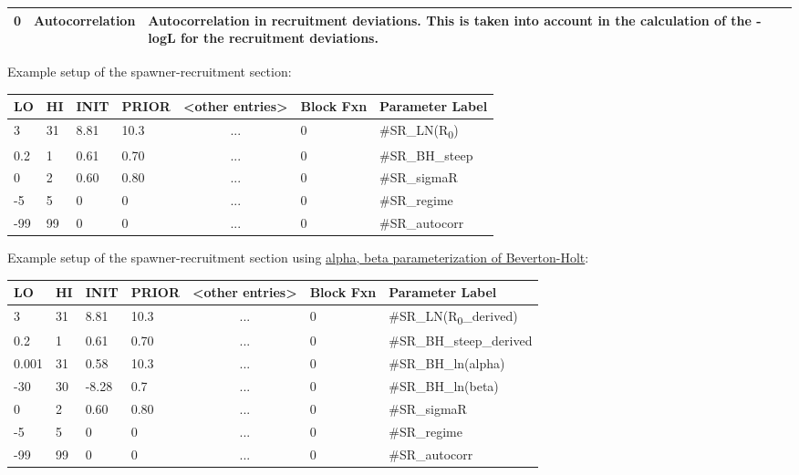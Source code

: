 \begin{longtable}{p{1cm} p{3cm} p{11cm}}
	0 & Autocorrelation & Autocorrelation in recruitment deviations. This is taken into account in the calculation of the -logL for the recruitment deviations. \Tstrut\Bstrut\\
	\hline
\end{longtable}


Example setup of the spawner-recruitment section:
\begin{center}
	\begin{longtable}{p{1cm} p{1cm} p{1cm} p{1.5cm} p{3cm} p{2cm} p{3.5cm}}
		
		\hline
		LO \Tstrut & HI & INIT & PRIOR & <other entries> & Block Fxn & Parameter Label \Bstrut\\
		\hline
		3   & 31 & 8.81 & 10.3 & \multicolumn{1}{c}{...} & 0 & \#SR\_LN(R\textsubscript{0}) \Tstrut\\
		0.2 & 1  & 0.61 & 0.70 & \multicolumn{1}{c}{...} & 0 & \#SR\_BH\_steep \\
		0   & 2  & 0.60 & 0.80 & \multicolumn{1}{c}{...} & 0 & \#SR\_sigmaR \\
		-5  & 5  & 0    & 0    & \multicolumn{1}{c}{...} & 0 & \#SR\_regime \\
		-99 & 99 & 0    & 0    & \multicolumn{1}{c}{...} & 0 & \#SR\_autocorr \Bstrut\\
		\hline
	\end{longtable}
\end{center}
\vspace*{-1.7\baselineskip}

Example setup of the spawner-recruitment section using \hyperlink{BH-ab}{alpha, beta parameterization of Beverton-Holt}:
\begin{center}
	\begin{longtable}{p{1cm} p{1cm} p{1cm} p{1.5cm} p{3cm} p{2cm} p{3.5cm}}
		
		\hline
		LO \Tstrut & HI & INIT & PRIOR & <other entries> & Block Fxn & Parameter Label \Bstrut\\
		\hline
		3     & 31 & 8.81  & 10.3 & \multicolumn{1}{c}{...} & 0 & \#SR\_LN(R\textsubscript{0}\_derived) \Tstrut\\
		0.2   & 1  & 0.61  & 0.70 & \multicolumn{1}{c}{...} & 0 & \#SR\_BH\_steep\_derived \\
		0.001 & 31 & 0.58  & 10.3 & \multicolumn{1}{c}{...} & 0 & \#SR\_BH\_ln(alpha) \\
        -30   & 30 & -8.28 & 0.7  & \multicolumn{1}{c}{...} & 0 & \#SR\_BH\_ln(beta) \\
		0     & 2  & 0.60  & 0.80 & \multicolumn{1}{c}{...} & 0 & \#SR\_sigmaR \\
		-5    & 5  & 0     & 0    & \multicolumn{1}{c}{...} & 0 & \#SR\_regime \\
		-99   & 99 & 0     & 0    & \multicolumn{1}{c}{...} & 0 & \#SR\_autocorr \Bstrut\\
		\hline
	\end{longtable}
\end{center}
\vspace*{-1.7\baselineskip}


